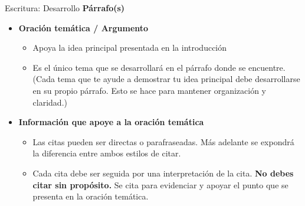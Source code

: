 \documentclass[
11pt, %
]{beamer}
\begin{document}
\begin{frame}{Escritura: Desarrollo}
	\textbf{Párrafo(s)}
	\begin{itemize}
		\item 	\textbf{Oración temática / Argumento}
		      \begin{itemize}
			      \item Apoya la idea principal presentada en la introducción
			      \item Es el único tema que se desarrollará en el párrafo donde se encuentre.(Cada tema que te ayude a demostrar tu idea principal debe desarrollarse en su propio párrafo. Esto se hace para mantener organización y claridad.)
		      \end{itemize}
		\item \textbf{Información que apoye a la oración temática}

		      \begin{itemize}
			      \item Las citas pueden ser directas o parafraseadas. Más adelante se expondrá la diferencia entre ambos estilos de citar.
			      \item Cada cita debe ser seguida por una interpretación de la cita. \textbf{No debes citar sin propósito.} Se cita para evidenciar y apoyar el punto que se presenta en la oración temática.
		      \end{itemize}
	\end{itemize}

\end{frame}
\end{document}
